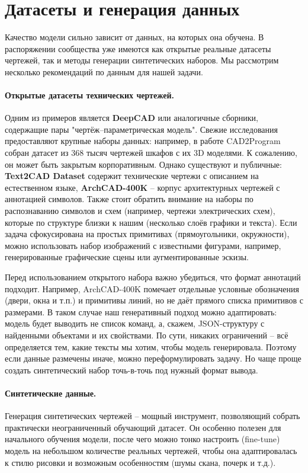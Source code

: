 \documentclass{article}
\begin{document}
\section{Датасеты и генерация данных}

Качество модели сильно зависит от данных, на которых она обучена. В распоряжении сообщества уже имеются как открытые реальные датасеты чертежей, так и методы генерации синтетических наборов. Мы рассмотрим несколько рекомендаций по данным для нашей задачи.

\paragraph{Открытые датасеты технических чертежей.} Одним из примеров является \textbf{DeepCAD} или аналогичные сборники, содержащие пары "чертёж–параметрическая модель". Свежие исследования предоставляют крупные наборы данных: например, в работе CAD2Program собран датасет из 368 тысяч чертежей шкафов с их 3D моделями. К сожалению, он может быть закрытым корпоративным. Однако существуют и публичные: \textbf{Text2CAD Dataset} содержит технические чертежи с описанием на естественном языке, \textbf{ArchCAD-400K} – корпус архитектурных чертежей с аннотацией символов. Также стоит обратить внимание на наборы по распознаванию символов и схем (например, чертежи электрических схем), которые по структуре близки к нашим (несколько слоёв графики и текста). Если задача сфокусирована на простых примитивах (прямоугольники, окружности), можно использовать набор изображений с известными фигурами, например, генерированные графические сцены или аугментированные эскизы.

Перед использованием открытого набора важно убедиться, что формат аннотаций подходит. Например, ArchCAD-400K помечает отдельные условные обозначения (двери, окна и т.п.) и примитивы линий, но не даёт прямого списка примитивов с размерами. В таком случае наш генеративный подход можно адаптировать: модель будет выводить не список команд, а, скажем, JSON-структуру с найденными объектами и их свойствами. По сути, никаких ограничений – всё определяется тем, какие тексты мы хотим, чтобы модель генерировала. Поэтому если данные размечены иначе, можно переформулировать задачу. Но чаще проще создать синтетический набор точь-в-точь под нужный формат вывода.

\paragraph{Синтетические данные.} Генерация синтетических чертежей – мощный инструмент, позволяющий собрать практически неограниченный обучающий датасет. Он особенно полезен для начального обучения модели, после чего можно тонко настроить (fine-tune) модель на небольшом количестве реальных чертежей, чтобы она адаптировалась к стилю рисовки и возможным особенностям (шумы скана, почерк и т.д.).
\end{document}
